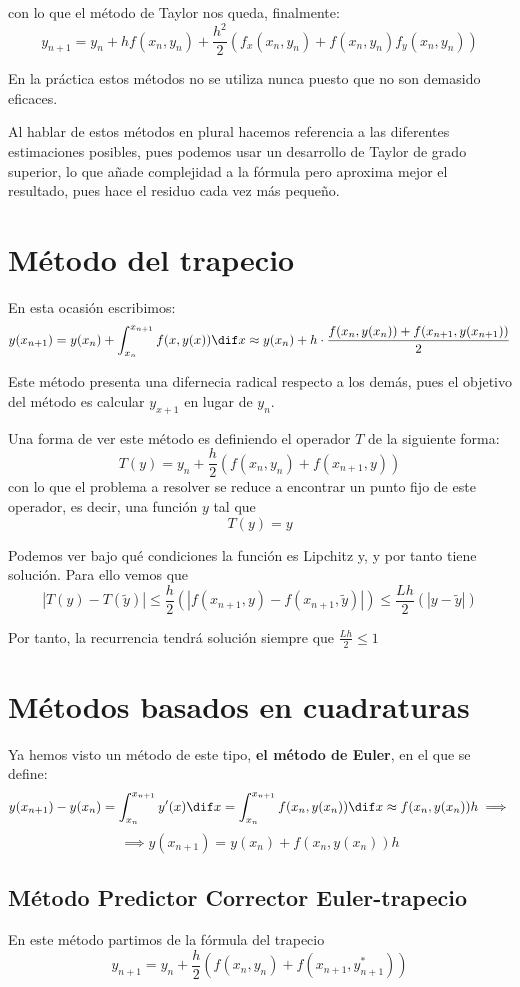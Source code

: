 \documentclass{apuntes}
\begin{document}
con lo que el método de Taylor nos queda, finalmente:
\[y_{n+1} = y_n + hf(x_n,y_n)+\frac{h^2}{2}\left(f_x(x_n,y_n)+f(x_n, y_n)f_y(x_n,y_n)\right)\]

\begin{remark}
En la práctica estos métodos no se utiliza nunca puesto que no son demasido eficaces.
\end{remark}

Al hablar de estos métodos en plural hacemos referencia a las diferentes estimaciones posibles, pues podemos usar un desarrollo de Taylor de grado superior, lo que añade complejidad a la fórmula pero aproxima mejor el resultado, pues hace el residuo cada vez más pequeño.


\section{Método del trapecio}
En esta ocasión escribimos:
\[y(x_{n+1})=y(x_n) + \int_{x_n}^{x_{n+1}} f(x,y(x))\dif x \approx y(x_n)+ h\cdot \frac{f(x_n,y(x_n))+f(x_{n+1},y(x_{n+1}))}{2}  \]

Este método presenta una difernecia radical respecto a los demás, pues el objetivo del método es calcular $y_{x+1}$ en lugar de $y_n$.

Una forma de ver este método es definiendo el operador $T$ de la siguiente forma:
\[T(y) = y_n + \frac{h}{2} \left(f(x_n,y_n)+f(x_{n+1}, y) \right)\]
con lo que el problema a resolver se reduce a encontrar un punto fijo de este operador, es decir, una función $y$ tal que
\[T(y)=y\]

Podemos ver bajo qué condiciones la función es Lipchitz y, y por tanto tiene solución. Para ello vemos que
\[|T(y) - T(\tilde{y})| \leq \frac{h}{2} \left( |f(x_{n+1}, y) - f(x_{n+1},\tilde{y})|\right) \leq \frac{Lh}{2}\left( |y-\tilde{y}|\right)\]

Por tanto, la recurrencia tendrá solución siempre que $\frac{Lh}{2} \leq 1$

\section{Métodos basados en cuadraturas}
Ya hemos visto un método de este tipo, \textbf{el método de Euler}, en el que se define:
\[y(x_{n+1}) -y(x_n) = \int_{x_n}^{x_{n+1}} y'(x)\dif x = \int_{x_n}^{x_{n+1}} f(x_n,y(x_n)) \dif x \approx f(x_n,y(x_n))h \implies \]
\[\implies y(x_{n+1}) =y(x_n)+f(x_n,y(x_n))h\]

\subsection{Método Predictor Corrector Euler-trapecio}
En este método partimos de la fórmula del trapecio
\[y_{n+1} = y_n + \frac{h}{2} \left(f(x_n,y_n)+f(x_{n+1}, y^*_{n+1}) \right)\]
\end{document}
